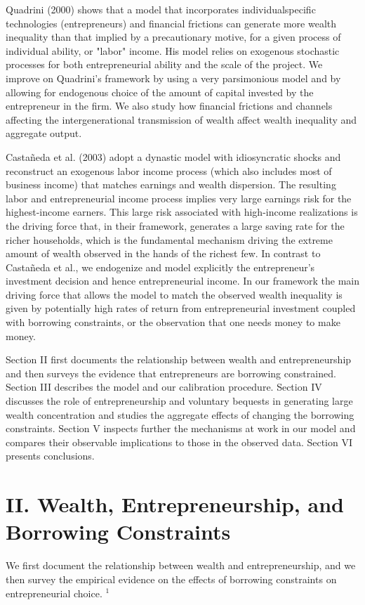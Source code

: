 \documentclass[10pt]{article}
\begin{document}
Quadrini (2000) shows that a model that incorporates individualspecific technologies (entrepreneurs) and financial frictions can generate more wealth inequality than that implied by a precautionary motive, for a given process of individual ability, or "labor" income. His model relies on exogenous stochastic processes for both entrepreneurial ability and the scale of the project. We improve on Quadrini's framework by using a very parsimonious model and by allowing for endogenous choice of the amount of capital invested by the entrepreneur in the firm. We also study how financial frictions and channels affecting the intergenerational transmission of wealth affect wealth inequality and aggregate output.

Castañeda et al. (2003) adopt a dynastic model with idiosyncratic shocks and reconstruct an exogenous labor income process (which also includes most of business income) that matches earnings and wealth dispersion. The resulting labor and entrepreneurial income process implies very large earnings risk for the highest-income earners. This large risk associated with high-income realizations is the driving force that, in their framework, generates a large saving rate for the richer households, which is the fundamental mechanism driving the extreme amount of wealth observed in the hands of the richest few. In contrast to Castañeda et al., we endogenize and model explicitly the entrepreneur's investment decision and hence entrepreneurial income. In our framework the main driving force that allows the model to match the observed wealth inequality is given by potentially high rates of return from entrepreneurial investment coupled with borrowing constraints, or the observation that one needs money to make money.

Section II first documents the relationship between wealth and entrepreneurship and then surveys the evidence that entrepreneurs are borrowing constrained. Section III describes the model and our calibration procedure. Section IV discusses the role of entrepreneurship and voluntary bequests in generating large wealth concentration and studies the aggregate effects of changing the borrowing constraints. Section V inspects further the mechanisms at work in our model and compares their observable implications to those in the observed data. Section VI presents conclusions.

\section*{II. Wealth, Entrepreneurship, and Borrowing Constraints}
We first document the relationship between wealth and entrepreneurship, and we then survey the empirical evidence on the effects of borrowing constraints on entrepreneurial choice. ${ }^{1}$
\end{document}
